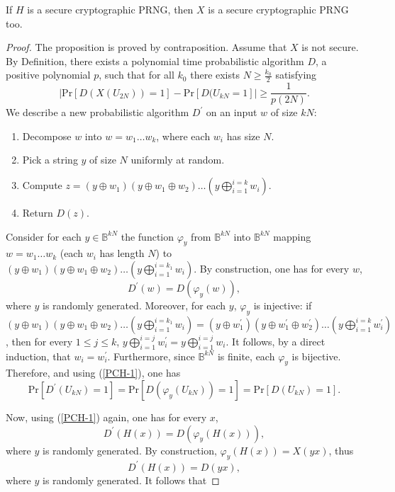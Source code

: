 \documentclass{article}
\begin{document}
\begin{proposition}
\label{cryptopreuve}
If $H$ is a secure cryptographic PRNG, then $X$ is a secure cryptographic
PRNG too.
\end{proposition}

\begin{proof}
The proposition is proved by contraposition. Assume that $X$ is not
secure. By Definition, there exists a polynomial time probabilistic
algorithm $D$, a positive polynomial $p$, such that for all $k_0$ there exists
$N\geq \frac{k_0}{2}$ satisfying 
$$| \mathrm{Pr}[D(X(U_{2N}))=1]-\mathrm{Pr}[D(U_{kN}=1]|\geq \frac{1}{p(2N)}.$$
We describe a new probabilistic algorithm $D^\prime$ on an input $w$ of size
$kN$:
\begin{enumerate}
\item Decompose $w$ into $w=w_1\ldots w_{k}$, where each $w_i$ has size $N$.
\item Pick a string $y$ of size $N$ uniformly at random.
\item Compute $z=(y\oplus w_1)(y\oplus w_1\oplus w_2)\ldots (y
  \bigoplus_{i=1}^{i=k} w_i).$
\item Return $D(z)$.
\end{enumerate}


Consider  for each $y\in \mathbb{B}^{kN}$ the function $\varphi_{y}$
from $\mathbb{B}^{kN}$ into $\mathbb{B}^{kN}$ mapping $w=w_1\ldots w_k$
(each $w_i$ has length $N$) to 
$(y\oplus w_1)(y\oplus w_1\oplus w_2)\ldots (y
  \bigoplus_{i=1}^{i=k_1} w_i).$ By construction, one has for every $w$,
\begin{equation}\label{PCH-1}
D^\prime(w)=D(\varphi_y(w)),
\end{equation}
where $y$ is randomly generated. 
Moreover, for each $y$, $\varphi_{y}$ is injective: if 
$(y\oplus w_1)(y\oplus w_1\oplus w_2)\ldots (y\bigoplus_{i=1}^{i=k_1}
w_i)=(y\oplus w_1^\prime)(y\oplus w_1^\prime\oplus w_2^\prime)\ldots
(y\bigoplus_{i=1}^{i=k} w_i^\prime)$, then for every $1\leq j\leq k$,
$y\bigoplus_{i=1}^{i=j} w_i^\prime=y\bigoplus_{i=1}^{i=j} w_i$. It follows,
by a direct induction, that $w_i=w_i^\prime$. Furthermore, since $\mathbb{B}^{kN}$
is finite, each $\varphi_y$ is bijective. Therefore, and using (\ref{PCH-1}),
one has
\begin{equation}\label{PCH-2}
\mathrm{Pr}[D^\prime(U_{kN})=1]=\mathrm{Pr}[D(\varphi_y(U_{kN}))=1]=\mathrm{Pr}[D(U_{kN})=1].
\end{equation}

Now, using (\ref{PCH-1}) again, one has  for every $x$,
\begin{equation}\label{PCH-3}
D^\prime(H(x))=D(\varphi_y(H(x))),
\end{equation}
where $y$ is randomly generated. By construction, $\varphi_y(H(x))=X(yx)$,
thus
\begin{equation}\label{PCH-3}
D^\prime(H(x))=D(yx),
\end{equation}
where $y$ is randomly generated. 
It follows that 


\end{proof}
\end{document}
